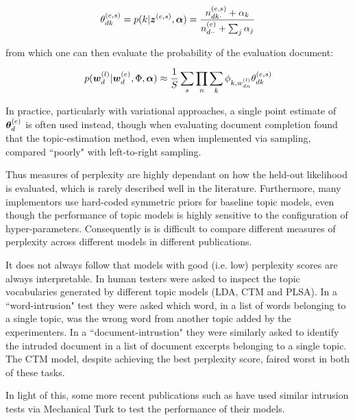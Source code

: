 \begin{align}
\theta^{(e,s)}_{dk} = p(k | \bm z^{(e,s)}, \bm \alpha) = \frac{n^{(e,s)}_{dk\cdot} + \alpha_k}{n^{(e)}_{d\cdot\cdot} + \sum_j \alpha_j}
\end{align}

from which one can then evaluate the probability of the evaluation document:

\begin{align}
p(\bm w_d^{(l)}|\bm w_d^{(e)}, \Phi, \bm \alpha) \approx
\frac{1}{ {S} } \sum_s \prod_n \sum_k \phi_{k,w^{(l)}_{dn}}\theta_{dk}^{(e,s)}
\end{align}

In practice, particularly with variational approaches, a single point estimate of $\bm \theta_d^{(e)}$ is often used instead\cite{Asuncion2012}, though when evaluating document completion \cite{Wallach2009} found that the topic-estimation method, even when implemented via sampling, compared ``poorly" with left-to-right sampling. 

Thus measures of perplexity are highly dependant on how the held-out likelihood is evaluated, which is rarely described well in the literature. Furthermore, many implementors use hard-coded symmetric priors for baseline topic models, even though the performance of topic models is highly sensitive to the configuration of hyper-parameters\cite{Asuncion2012}\cite{Wallach2006}. Consequently is is difficult to compare different measures of perplexity across different models in different publications.

It does not always follow that models with good (i.e. low) perplexity scores are always interpretable. In\cite{Chang2009} human testers were asked to inspect the topic vocabularies generated by different topic models (LDA, CTM and PLSA). In a ``word-intrusion" test they were asked which word, in a list of words belonging to a single topic, was the wrong word from another topic added by the experimenters. In a ``document-intrustion" they were similarly asked to identify the intruded document in a list of document excerpts belonging to a single topic. The CTM model, despite achieving the best perplexity score, faired worst in both of these tasks. 


In light of this, some more recent publications such as \cite{Li2006}\cite{Wang2007}\cite{Lindsey2012} have used similar intrusion tests via Mechanical Turk to test the performance of their models.

